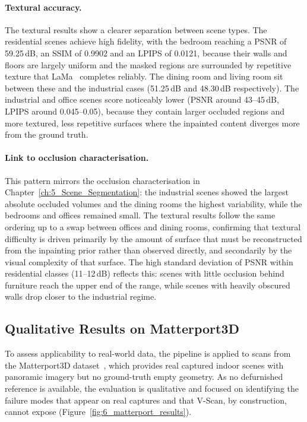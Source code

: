 \paragraph{Textural accuracy.}
The textural results show a clearer separation between scene types. The residential scenes achieve high fidelity, with the bedroom reaching a PSNR of 59.25\,dB, an SSIM of 0.9902 and an LPIPS of 0.0121, because their walls and floors are largely uniform and the masked regions are surrounded by repetitive texture that LaMa~\cite{suvorov_resolution-robust_2022} completes reliably. The dining room and living room sit between these and the industrial cases (51.25\,dB and 48.30\,dB respectively). The industrial and office scenes score noticeably lower (PSNR around 43--45\,dB, LPIPS around 0.045--0.05), because they contain larger occluded regions and more textured, less repetitive surfaces where the inpainted content diverges more from the ground truth.

\paragraph{Link to occlusion characterisation.}
This pattern mirrors the occlusion characterisation in Chapter~\ref{ch:5_Scene_Segmentation}: the industrial scenes showed the largest absolute occluded volumes and the dining rooms the highest variability, while the bedrooms and offices remained small. The textural results follow the same ordering up to a swap between offices and dining rooms, confirming that textural difficulty is driven primarily by the amount of surface that must be reconstructed from the inpainting prior rather than observed directly, and secondarily by the visual complexity of that surface. The high standard deviation of PSNR within residential classes (11--12\,dB) reflects this: scenes with little occlusion behind furniture reach the upper end of the range, while scenes with heavily obscured walls drop closer to the industrial regime.


\subsection{Qualitative Results on Matterport3D}
\label{sec:6_exp_matterport}
 
To assess applicability to real-world data, the pipeline is applied to scans from the Matterport3D dataset~\cite{chang_matterport3d_2017}, which provides real captured indoor scenes with panoramic imagery but no ground-truth empty geometry. As no defurnished reference is available, the evaluation is qualitative and focused on identifying the failure modes that appear on real captures and that V-Scan, by construction, cannot expose (Figure~\ref{fig:6_matterport_results}).
 
